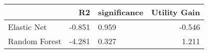 \begin{tabular}{lrlr}
\toprule
{} &     R2 & significance &  Utility Gain \\
\midrule
Elastic Net   & -0.851 &       0.959  &        -0.546 \\
Random Forest & -4.281 &       0.327  &         1.211 \\
\bottomrule
\end{tabular}
